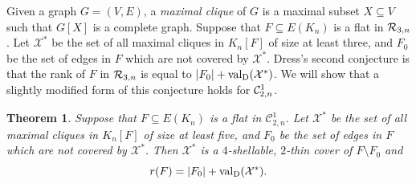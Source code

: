 \documentclass{daj}
\newtheorem{thm}{Theorem}[section]\theoremstyle{plain}
\newcommand{\MC}{{\mathcal C}}
\newcommand{\MX}{{\mathcal X}}
\newcommand{\valD}{{\rm val}_{\rm D}}
\begin{document}
Given a graph $G=(V,E)$, a {\em maximal clique} of $G$ is a maximal subset $X\subseteq V$ such that $G[X]$ is a complete graph.
Suppose that $F\subseteq E(K_n)$ 
is a flat in ${\cal R}_{3,n}$.
Let $\MX^*$ be the set of all  maximal cliques in $K_n[F]$ of size at least three, and $F_0$ be the set of edges in $F$ which are not covered by $\MX^*$.
Dress's second conjecture is that the rank of $F$ in ${\cal R}_{3,n}$ is equal to $|F_0|+\valD(\MX^*)$. We will show that a slightly modified form of this conjecture holds for 
${\cal C}_{2,n}^1$. 


\begin{thm}\label{thm:dress}
Suppose that $F\subseteq E(K_n)$ is a flat in $\MC_{2,n}^1$. Let $\MX^*$ be the set of all maximal cliques in $K_n[F]$ of size at least five, and $F_0$ be the set of edges in $F$ which are not covered by $\MX^*$.
Then $\MX^*$ is a $4$-shellable, $2$-thin cover of $F\setminus F_0$ and
\begin{equation}\label{eq:dressrank}
r(F)=|F_0|+\valD(\MX^*).
\end{equation}
\end{thm}
\end{document}
